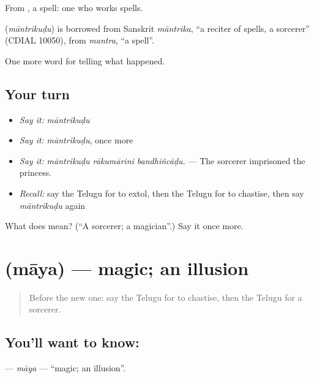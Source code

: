 From , a spell: one who works spells.

\begin{cousinweb}
\textbf{} (\emph{māntrikuḍu}) is borrowed from Sanskrit \emph{māntrika}, \textquotedblleft{}a reciter of spells, a sorcerer\textquotedblright{} (CDIAL 10050), from \emph{mantra}, \textquotedblleft{}a spell\textquotedblright{}.
\end{cousinweb}

\begin{grammarlens}[title={What you've built}]
One more word for telling what happened.
\end{grammarlens}

\subsection*{Your turn}
\begin{itemize}
\raggedright
  \item \emph{Say it:} \emph{māntrikuḍu}
  \item \emph{Say it:} \emph{māntrikuḍu}, once more
  \item \emph{Say it:} \emph{māntrikuḍu rākumārini bandhiñcāḍu.} — The sorcerer imprisoned the princess.
  \item \emph{Recall:} say the Telugu for to extol, then the Telugu for to chastise, then say \emph{māntrikuḍu} again
\end{itemize}

\begin{tcolorbox}[breakable,colback=teal!4,colframe=teal!35!black,title={Before you move on}]
What does  mean? (\textquotedblleft{}A sorcerer; a magician\textquotedblright{}.) Say it once more.
\end{tcolorbox}
\section[\texorpdfstring{\te{మాయ} (māya)}{మాయ (māya)}]{ (māya) — magic; an illusion}

\label{lesson:TE-C371-maya}



\begin{quote}
Before the new one: say the Telugu for to chastise, then the Telugu for a sorcerer.
\end{quote}

\subsection*{You'll want to know: }
\textbf{} — \emph{māya} — \textquotedblleft{}magic; an illusion\textquotedblright{}.


